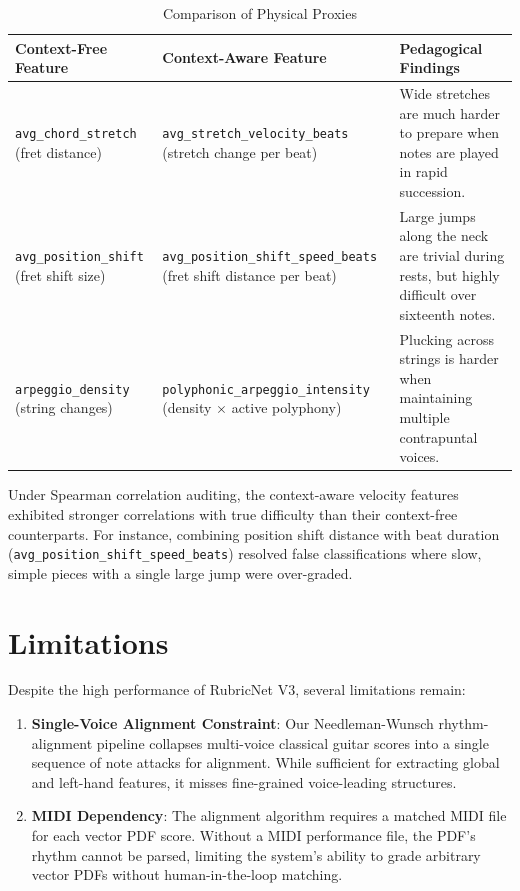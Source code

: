 \begin{table}[h]
\centering
\caption{Comparison of Physical Proxies}
\label{tab:proxy_comparison}
\begin{tabular}{L{4.5cm}L{4.5cm}L{5cm}}
\toprule
\textbf{Context-Free Feature} & \textbf{Context-Aware Feature} & \textbf{Pedagogical Findings} \\
\midrule
\texttt{avg\_chord\_stretch} \newline (fret distance) & \texttt{avg\_stretch\_velocity\_beats} \newline (stretch change per beat) & Wide stretches are much harder to prepare when notes are played in rapid succession. \\
\midrule
\texttt{avg\_position\_shift} \newline (fret shift size) & \texttt{avg\_position\_shift\_speed\_beats} \newline (fret shift distance per beat) & Large jumps along the neck are trivial during rests, but highly difficult over sixteenth notes. \\
\midrule
\texttt{arpeggio\_density} \newline (string changes) & \texttt{polyphonic\_arpeggio\_intensity} \newline (density $\times$ active polyphony) & Plucking across strings is harder when maintaining multiple contrapuntal voices. \\
\bottomrule
\end{tabular}
\end{table}

Under Spearman correlation auditing, the context-aware velocity features exhibited stronger correlations with true difficulty than their context-free counterparts. For instance, combining position shift distance with beat duration (\texttt{avg\_position\_shift\_speed\_beats}) resolved false classifications where slow, simple pieces with a single large jump were over-graded.

\section{Limitations}
Despite the high performance of RubricNet V3, several limitations remain:
\begin{enumerate}
    \item \textbf{Single-Voice Alignment Constraint}: Our Needleman-Wunsch rhythm-alignment pipeline collapses multi-voice classical guitar scores into a single sequence of note attacks for alignment. While sufficient for extracting global and left-hand features, it misses fine-grained voice-leading structures.
    \item \textbf{MIDI Dependency}: The alignment algorithm requires a matched MIDI file for each vector PDF score. Without a MIDI performance file, the PDF's rhythm cannot be parsed, limiting the system's ability to grade arbitrary vector PDFs without human-in-the-loop matching.
\end{enumerate}
